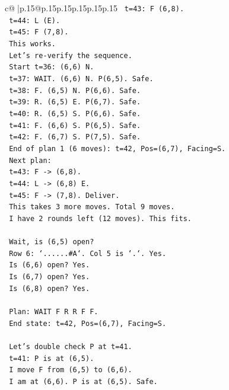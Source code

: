 \documentclass{article}
\begin{document}
{\begin{supertabular}{c@{$\;$}|p{.15\linewidth}@{}p{.15\linewidth}p{.15\linewidth}p{.15\linewidth}p{.15\linewidth}p{.15\linewidth}}
{{{\texttt{   t=43: F (6,8).} \\
\texttt{   t=44: L (E).} \\
\texttt{   t=45: F (7,8).} \\
\texttt{   This works.} \\
\texttt{   Let's re{-}verify the sequence.} \\
\texttt{   Start t=36: (6,6) N.} \\
\texttt{   t=37: WAIT. (6,6) N. P(6,5). Safe.} \\
\texttt{   t=38: F. (6,5) N. P(6,6). Safe.} \\
\texttt{   t=39: R. (6,5) E. P(6,7). Safe.} \\
\texttt{   t=40: R. (6,5) S. P(6,6). Safe.} \\
\texttt{   t=41: F. (6,6) S. P(6,5). Safe.} \\
\texttt{   t=42: F. (6,7) S. P(7,5). Safe.} \\
\texttt{   End of plan 1 (6 moves): t=42, Pos=(6,7), Facing=S.} \\
\texttt{   Next plan:} \\
\texttt{   t=43: F {-}> (6,8).} \\
\texttt{   t=44: L {-}> (6,8) E.} \\
\texttt{   t=45: F {-}> (7,8). Deliver.} \\
\texttt{   This takes 3 more moves. Total 9 moves.} \\
\texttt{   I have 2 rounds left (12 moves). This fits.} \\
\\ 
\texttt{   Wait, is (6,5) open?} \\
\texttt{   Row 6: `......\#A`. Col 5 is `.`. Yes.} \\
\texttt{   Is (6,6) open? Yes.} \\
\texttt{   Is (6,7) open? Yes.} \\
\texttt{   Is (6,8) open? Yes.} \\
\\ 
\texttt{   Plan: WAIT F R R F F.} \\
\texttt{   End state: t=42, Pos=(6,7), Facing=S.} \\
\\ 
\texttt{   Let's double check P at t=41.} \\
\texttt{   t=41: P is at (6,5).} \\
\texttt{   I move F from (6,5) to (6,6).} \\
\texttt{   I am at (6,6). P is at (6,5). Safe.} \\
}}}
\end{supertabular}}
\end{document}
